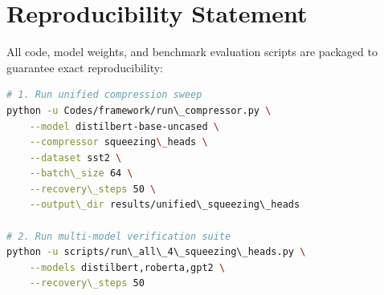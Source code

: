 \section{Reproducibility Statement}
All code, model weights, and benchmark evaluation scripts are packaged to guarantee exact reproducibility:
\begin{lstlisting}[language=bash]
# 1. Run unified compression sweep
python -u Codes/framework/run\_compressor.py \
    --model distilbert-base-uncased \
    --compressor squeezing\_heads \
    --dataset sst2 \
    --batch\_size 64 \
    --recovery\_steps 50 \
    --output\_dir results/unified\_squeezing\_heads

# 2. Run multi-model verification suite
python -u scripts/run\_all\_4\_squeezing\_heads.py \
    --models distilbert,roberta,gpt2 \
    --recovery\_steps 50
\end{lstlisting}
